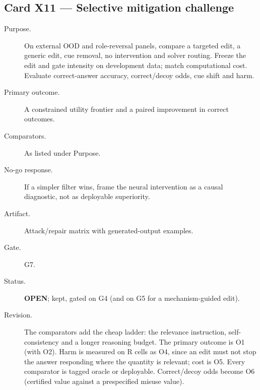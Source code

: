\documentclass[10pt,a4paper]{article}
\begin{document}
\subsection{Card X11 --- Selective mitigation challenge}
\label{card:X11}
\begin{description}
\item[Purpose.] On external OOD and role-reversal panels, compare a targeted edit, a generic edit, cue removal,
no intervention and solver routing. Freeze the edit and gate intensity on development data; match computational
cost. Evaluate correct-answer accuracy, correct/decoy odds, cue shift and harm.
\item[Primary outcome.] A constrained utility frontier and a paired improvement in correct outcomes.
\item[Comparators.] As listed under Purpose.
\item[No-go response.] If a simpler filter wins, frame the neural intervention as a causal diagnostic, not as
deployable superiority.
\item[Artifact.] Attack/repair matrix with generated-output examples.
\item[Gate.] G7.
\item[Status.] \textbf{OPEN}; kept, gated on G4 (and on G5 for a mechanism-guided edit).
\item[Revision.] The comparators add the cheap ladder: the relevance instruction, self-consistency and a longer
reasoning budget. The primary outcome is O1 (with O2). Harm is measured on R cells as O4, since an edit must not
stop the answer responding where the quantity is relevant; cost is O5. Every comparator is tagged oracle or
deployable. Correct/decoy odds become O6 (certified value against a prespecified misuse value).
\end{description}

\end{document}
